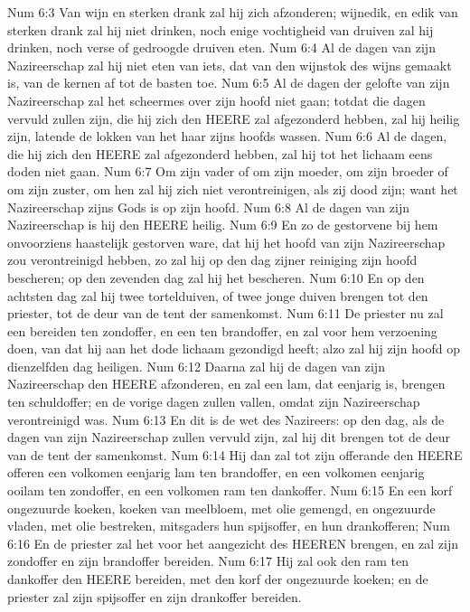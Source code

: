 Num 6:3  Van wijn en sterken drank zal hij zich afzonderen; wijnedik, en edik van sterken drank zal hij niet drinken, noch enige vochtigheid van druiven zal hij drinken, noch verse of gedroogde druiven eten.
Num 6:4  Al de dagen van zijn Nazireerschap zal hij niet eten van iets, dat van den wijnstok des wijns gemaakt is, van de kernen af tot de basten toe.
Num 6:5  Al de dagen der gelofte van zijn Nazireerschap zal het scheermes over zijn hoofd niet gaan; totdat die dagen vervuld zullen zijn, die hij zich den HEERE zal afgezonderd hebben, zal hij heilig zijn, latende de lokken van het haar zijns hoofds wassen.
Num 6:6  Al de dagen, die hij zich den HEERE zal afgezonderd hebben, zal hij tot het lichaam eens doden niet gaan.
Num 6:7  Om zijn vader of om zijn moeder, om zijn broeder of om zijn zuster, om hen zal hij zich niet verontreinigen, als zij dood zijn; want het Nazireerschap zijns Gods is op zijn hoofd.
Num 6:8  Al de dagen van zijn Nazireerschap is hij den HEERE heilig.
Num 6:9  En zo de gestorvene bij hem onvoorziens haastelijk gestorven ware, dat hij het hoofd van zijn Nazireerschap zou verontreinigd hebben, zo zal hij op den dag zijner reiniging zijn hoofd bescheren; op den zevenden dag zal hij het bescheren.
Num 6:10  En op den achtsten dag zal hij twee tortelduiven, of twee jonge duiven brengen tot den priester, tot de deur van de tent der samenkomst.
Num 6:11  De priester nu zal een bereiden ten zondoffer, en een ten brandoffer, en zal voor hem verzoening doen, van dat hij aan het dode lichaam gezondigd heeft; alzo zal hij zijn hoofd op dienzelfden dag heiligen.
Num 6:12  Daarna zal hij de dagen van zijn Nazireerschap den HEERE afzonderen, en zal een lam, dat eenjarig is, brengen ten schuldoffer; en de vorige dagen zullen vallen, omdat zijn Nazireerschap verontreinigd was.
Num 6:13  En dit is de wet des Nazireers: op den dag, als de dagen van zijn Nazireerschap zullen vervuld zijn, zal hij dit brengen tot de deur van de tent der samenkomst.
Num 6:14  Hij dan zal tot zijn offerande den HEERE offeren een volkomen eenjarig lam ten brandoffer, en een volkomen eenjarig ooilam ten zondoffer, en een volkomen ram ten dankoffer.
Num 6:15  En een korf ongezuurde koeken, koeken van meelbloem, met olie gemengd, en ongezuurde vladen, met olie bestreken, mitsgaders hun spijsoffer, en hun drankofferen;
Num 6:16  En de priester zal het voor het aangezicht des HEEREN brengen, en zal zijn zondoffer en zijn brandoffer bereiden.
Num 6:17  Hij zal ook den ram ten dankoffer den HEERE bereiden, met den korf der ongezuurde koeken; en de priester zal zijn spijsoffer en zijn drankoffer bereiden.
